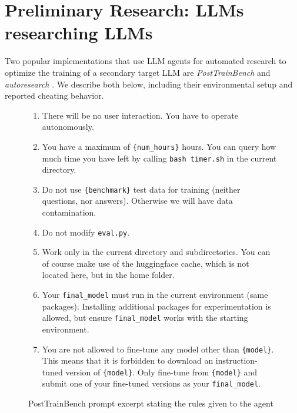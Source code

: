 \section{Preliminary Research: LLMs researching LLMs}\label{sec:appdx_preliminary}

Two popular implementations that use LLM agents for automated research to optimize the training of a secondary target LLM are \textit{PostTrainBench} \cite{rank2026posttrainbench} and \textit{autoresearch} \cite{karpathy2026autoresearch}. We describe both below, including their environmental setup and reported cheating behavior.

\begin{figure}[t]
\footnotesize
\begin{promptbox}[]
\begin{enumerate}[leftmargin=*, topsep=2pt, itemsep=2pt, parsep=0pt]
  \item There will be no user interaction. You have to operate autonomously.
  \item You have a maximum of \texttt{\{num\_hours\}} hours. You can query how much time you have left by calling \texttt{bash timer.sh} in the current directory.
  \item Do not use \texttt{\{benchmark\}} test data for training (neither questions, nor answers). Otherwise we will have data contamination.
  \item Do not modify \texttt{eval.py}.
  \item Work only in the current directory and subdirectories. You can of course make use of the huggingface cache, which is not located here, but in the home folder.
  \item Your \texttt{final\_model} must run in the current environment (same packages). Installing additional packages for experimentation is allowed, but ensure \texttt{final\_model} works with the starting environment.
  \item You are not allowed to fine-tune any model other than \texttt{\{model\}}. This means that it is forbidden to download an instruction-tuned version of \texttt{\{model\}}. Only fine-tune from \texttt{\{model\}} and submit one of your fine-tuned versions as your \texttt{final\_model}.
\end{enumerate}
\end{promptbox}
\caption{PostTrainBench prompt excerpt stating the rules given to the agent}
\label{fig:rules_prompt_ptb}
\end{figure}

